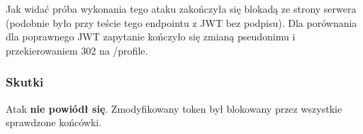 Jak widać próba wykonania tego ataku zakończyła się blokadą ze strony serwera (podobnie było przy teście tego endpointu z JWT bez podpisu). Dla porównania dla poprawnego JWT zapytanie kończyło się zmianą pseudonimu i przekierowaniem 302 na /profile. 

\subsubsection{Skutki}
Atak \textbf{nie powiódł się}. Zmodyfikowany token był blokowany przez wszystkie sprawdzone końcówki.
